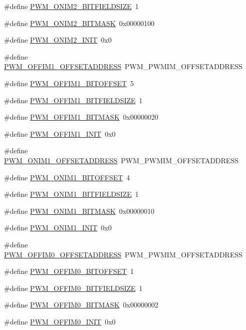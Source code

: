 \begin{DoxyCompactItemize}
\item 
\#define \hyperlink{a00565_a4627793b4810f33e028618e974dab71d}{PWM\_\-ONIM2\_\-BITFIELDSIZE}~1
\item 
\#define \hyperlink{a00565_a45b02b49077c722e98c59b5fe89dd2a2}{PWM\_\-ONIM2\_\-BITMASK}~0x00000100
\item 
\#define \hyperlink{a00565_a30aff2b2296aa6b8ef04e418f92085e8}{PWM\_\-ONIM2\_\-INIT}~0x0
\item 
\#define \hyperlink{a00565_ad71f32a8d545c6033402b2b62abe6120}{PWM\_\-OFFIM1\_\-OFFSETADDRESS}~PWM\_\-PWMIM\_\-OFFSETADDRESS
\item 
\#define \hyperlink{a00565_a8b81fe77f2c57a36af74f6e345a2e21b}{PWM\_\-OFFIM1\_\-BITOFFSET}~5
\item 
\#define \hyperlink{a00565_a9495e1fb3f916dba97607f5a96d80613}{PWM\_\-OFFIM1\_\-BITFIELDSIZE}~1
\item 
\#define \hyperlink{a00565_ad66e14a243cfe054609b4768cb1095e5}{PWM\_\-OFFIM1\_\-BITMASK}~0x00000020
\item 
\#define \hyperlink{a00565_a6b3ea49e054b5b22f00931a21f8215f7}{PWM\_\-OFFIM1\_\-INIT}~0x0
\item 
\#define \hyperlink{a00565_ab7cd5ba873031bd3d4bb8a7b173a8f6b}{PWM\_\-ONIM1\_\-OFFSETADDRESS}~PWM\_\-PWMIM\_\-OFFSETADDRESS
\item 
\#define \hyperlink{a00565_a7f08790e34410dfd96c9874b33f18602}{PWM\_\-ONIM1\_\-BITOFFSET}~4
\item 
\#define \hyperlink{a00565_ab5c9df7bd6f64d10ddd1653e921dc6c6}{PWM\_\-ONIM1\_\-BITFIELDSIZE}~1
\item 
\#define \hyperlink{a00565_ad3f1f166f59fc9435af3dd3ccb336033}{PWM\_\-ONIM1\_\-BITMASK}~0x00000010
\item 
\#define \hyperlink{a00565_ab8730bf4f51dc9a83599cf86d88ed63f}{PWM\_\-ONIM1\_\-INIT}~0x0
\item 
\#define \hyperlink{a00565_af94ba5e00da014775b64ab73712c90d0}{PWM\_\-OFFIM0\_\-OFFSETADDRESS}~PWM\_\-PWMIM\_\-OFFSETADDRESS
\item 
\#define \hyperlink{a00565_ab1bbe80c83ff0aa3014c4aa9e442a13f}{PWM\_\-OFFIM0\_\-BITOFFSET}~1
\item 
\#define \hyperlink{a00565_a1553c8ebc3a22a8b7a9443c95c3a9a28}{PWM\_\-OFFIM0\_\-BITFIELDSIZE}~1
\item 
\#define \hyperlink{a00565_a01e614a0416e13e6f17f18e0bef689ed}{PWM\_\-OFFIM0\_\-BITMASK}~0x00000002
\item 
\#define \hyperlink{a00565_a9f78151961be85de838922f5fbd3d5e1}{PWM\_\-OFFIM0\_\-INIT}~0x0

\end{DoxyCompactItemize}
